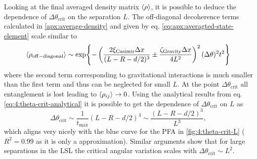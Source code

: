 Looking at the final averaged density matrix $\left\langle\rho\right\rangle$, it is possible to deduce the dependence of $\Delta \theta_\mathrm{crit}$ on the separation $L$. The off-diagonal decoherence terms calculated in \cref{apx:average-density} and given by eq. \eqref{eq:apx:averagted-state-element} scale similar to
\begin{equation}
  \left\langle\rho_\mathrm{off-diagonal}\right\rangle \sim \exp{-\left(\frac{2 \xi_\mathrm{Casimir} \Delta x}{(L - R - d/2)^3} \pm \frac{\zeta_\mathrm{Gravity} \Delta x}{4 L^2} \right)^2 (\Delta \theta)^2 t^2}
\end{equation}
where the second term corresponding to gravitational interactions is much smaller than the first term and thus can be neglected for small $L$.
At the point $\Delta \theta_\mathrm{crit}$ all entanglement is lost leading to $\left\langle\rho_{ij}\right\rangle \rightarrow 0$. Using the analytical results from eq. \eqref{eq:4:theta-crit-analytical} it is possible to get the dependence of $\Delta \theta_\mathrm{crit}$ on $L$ as
\begin{equation}\label{eq:4:delta-theta-scaling-L}
  \Delta \theta_\mathrm{crit} \sim \frac{1}{t_\mathrm{max}} (L - R - d/2)^3 \sim \frac{(L - R - d/2)^3}{L^3} ,
\end{equation}
which aligns very nicely with the blue curve for the PFA in \cref{fig:4:theta-crit-L} ($R^2 = 0.99$ as it is only a approximation). Similar arguments show that for large separations in the LSL the critical angular variation scales with $\Delta \theta_\mathrm{crit} \sim L^2$.

